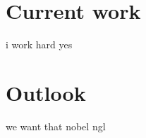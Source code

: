\documentclass[12pt]{report}
\begin{document}
	
	
	
	
	
	
	
	
	
	
	
	
	
	
	\chapter{Current work}
	i work hard yes
	
	
	
	
	
	
	
	
	
	\chapter{Outlook}
	
	we want that nobel ngl
	
	
	
\end{document}
